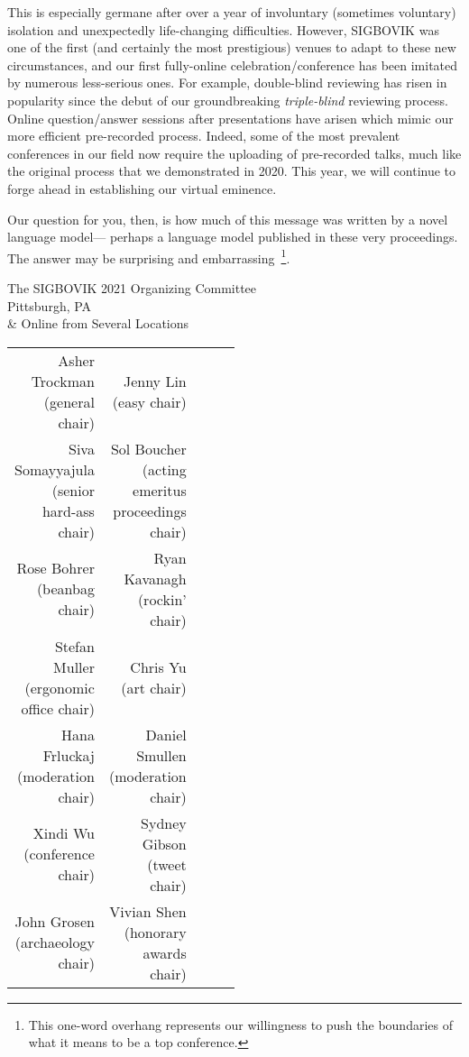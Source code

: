 \documentclass[12pt]{article}
\begin{document}
This is especially germane after over a year of involuntary (sometimes voluntary) isolation and unexpectedly life-changing difficulties.
However, SIGBOVIK was one of the first (and certainly the most prestigious) venues to adapt to these new circumstances,
and our first fully-online celebration/conference has been imitated by numerous less-serious ones.
For example, double-blind reviewing has risen in popularity since the debut of our groundbreaking \emph{triple-blind} reviewing process.
Online question/answer sessions after presentations have arisen which mimic our more efficient pre-recorded process.
Indeed, some of the most prevalent conferences in our field now require the uploading of pre-recorded talks,
much like the original process that we demonstrated in 2020.
This year, we will continue to forge ahead in establishing our virtual eminence.

Our question for you, then, is how much of this message was written by a novel language model---
perhaps a language model published in these very proceedings.
The answer may be surprising and embarrassing~\footnote{This one-word overhang represents our willingness to push the boundaries of what it means to be a top conference.}.

\begin{flushright}
The SIGBOVIK 2021 Organizing Committee\\
Pittsburgh, PA \\
\& Online from Several Locations
\vspace{1em}

\begin{tabular}{r r p{0.5\linewidth}}
	Asher Trockman (general chair) &
Jenny Lin (easy chair)\\
	Siva Somayyajula (senior hard-ass chair) &
Sol Boucher (acting emeritus proceedings chair)\\
	Rose Bohrer (beanbag chair) &
Ryan Kavanagh (rockin' chair)\\
	Stefan Muller (ergonomic office chair) &
Chris Yu (art chair)\\
	Hana Frluckaj (moderation chair) &
Daniel Smullen (moderation chair)\\
	Xindi Wu (conference chair) &
Sydney Gibson (tweet chair)\\
	John Grosen (archaeology chair) &
	Vivian Shen (honorary awards chair)
\end{tabular}


\end{flushright}

%
%
\thispagestyle{empty}
\end{document}
